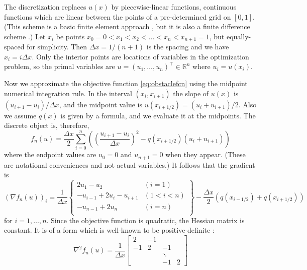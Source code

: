 \documentclass[11pt]{article}
\newcommand{\RR}{\mathbb{R}}
\newcommand{\grad}{\nabla}
\begin{document}
The discretization replaces $u(x)$ by piecewise-linear functions, continuous functions which are linear between the points of a pre-determined grid on $[0,1]$.  (This scheme is a basic finite element approach \cite{Elmanetal2014}, but it is also a finite difference scheme \cite{LeVeque2007}.)  Let $x_i$ be points $x_0 = 0 < x_1 < x_2 < \dots < x_n < x_{n+1}=1$, but equally-spaced for simplicity.  Then $\Delta x = 1 / (n+1)$ is the spacing and we have $x_i = i\Delta x$.  Only the interior points are locations of variables in the optimization problem, so the primal variables are $u = (u_1,\dots,u_n)^\top \in \RR^n$ where $u_i=u(x_i)$.

Now we approximate the objective function \eqref{eq:obstaclefcn} using the midpoint numerical integration rule.  In the interval $(x_i,x_{i+1})$ the slope of $u(x)$ is $(u_{i+1}-u_i)/\Delta x$, and the midpoint value is $u(x_{i+1/2}) = (u_i + u_{i+1})/2$.  Also we assume $q(x)$ is given by a formula, and we evaluate it at the midpoints.  The discrete object is, therefore,
\begin{equation}
    f_n(u) = \frac{\Delta x}{2} \sum_{i=0}^n \left(\left(\frac{u_{i+1}-u_i}{\Delta x}\right)^2 - q(x_{i+1/2}) (u_i + u_{i+1})\right) \label{eq:discobstaclefcn}
\end{equation}
where the endpoint values are $u_0=0$ and $u_{n+1}=0$ when they appear.  (These are notational conveniences and not actual variables.)  It follows that the gradient is
\begin{equation}
\left(\grad f_n(u)\right)_i = \frac{1}{\Delta x} \left\{\begin{matrix}
2 u_1 - u_2 & (i=1) \\
-u_{i-1} + 2 u_i - u_{i+1} & (1<i<n) \\
-u_{n-1} + 2 u_n & (i=n) \\
\end{matrix} \right\} - \frac{\Delta x}{2} (q(x_{i-1/2}) + q(x_{i+1/2}))
\end{equation}
for $i=1,\dots,n$.  Since the objective function is quadratic, the Hessian matrix is constant.  It is of a form which is well-known to be positive-definite \cite{LeVeque2007}:
\begin{equation}
\grad^2 f_n(u) = \frac{1}{\Delta x} \begin{bmatrix}
2  & -1 &    &    \\
-1 &  2 & -1 &    \\
   &    & \ddots &\\
   &    & -1 &  2
\end{bmatrix}
\end{equation}
\end{document}
